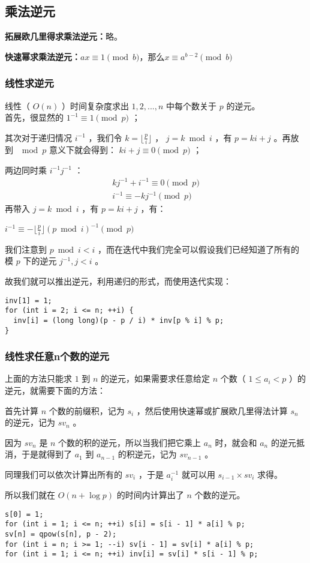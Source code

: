 \subsection{乘法逆元}
\textbf{拓展欧几里得求乘法逆元：}略。\par
\textbf{快速幂求乘法逆元：}$ax\equiv 1\pmod b\text{，那么} x\equiv a^{b-2}\pmod b$
\subsubsection{线性求逆元}
线性（ $O(n)$ ）时间复杂度求出 $1,2,...,n$ 中每个数关于 $p$ 的逆元。\\
首先，很显然的 $1^{-1} \equiv 1 \pmod p$ ；\par
其次对于递归情况 $i^{-1}$ ，我们令 $k = \lfloor \frac{p}{i} \rfloor$ ， $j = k \bmod i$ ，有 $p = ki + j$ 。再放到 $\mod p$ 意义下就会得到： $ki+j \equiv 0 \pmod p$ ；\par
两边同时乘 $i^{-1}j^{-1}$ ：
\begin{align*}
  kj^{-1}+i^{-1} \equiv 0 \pmod p \\
  i^{-1} \equiv -kj^{-1} \pmod p
\end{align*}
再带入 $j = k \bmod i$ ，有 $p = ki + j$ ，有：\par
 $i^{-1} \equiv -\lfloor\frac{p}{i}\rfloor (p \bmod i)^{-1} \pmod p$ 

我们注意到 $p \bmod i < i$ ，而在迭代中我们完全可以假设我们已经知道了所有的模 $p$ 下的逆元 $j^{-1}, j < i$ 。

故我们就可以推出逆元，利用递归的形式，而使用迭代实现：
\begin{lstlisting}
inv[1] = 1;
for (int i = 2; i <= n; ++i) {
  inv[i] = (long long)(p - p / i) * inv[p % i] % p;
}
\end{lstlisting}
\subsubsection{线性求任意n个数的逆元}
上面的方法只能求 $1$ 到 $n$ 的逆元，如果需要求任意给定 $n$ 个数（ $1 \le a_i < p$ ）的逆元，就需要下面的方法：\par
首先计算 $n$ 个数的前缀积，记为 $s_i$ ，然后使用快速幂或扩展欧几里得法计算 $s_n$ 的逆元，记为 $sv_n$ 。\par
因为 $sv_n$ 是 $n$ 个数的积的逆元，所以当我们把它乘上 $a_n$ 时，就会和 $a_n$ 的逆元抵消，于是就得到了 $a_1$ 到 $a_{n-1}$ 的积逆元，记为 $sv_{n-1}$ 。\par
同理我们可以依次计算出所有的 $sv_i$ ，于是 $a_i^{-1}$ 就可以用 $s_{i-1} \times sv_i$ 求得。\par
所以我们就在 $O(n + \log p)$ 的时间内计算出了 $n$ 个数的逆元。
\begin{lstlisting}
s[0] = 1;
for (int i = 1; i <= n; ++i) s[i] = s[i - 1] * a[i] % p;
sv[n] = qpow(s[n], p - 2);
for (int i = n; i >= 1; --i) sv[i - 1] = sv[i] * a[i] % p;
for (int i = 1; i <= n; ++i) inv[i] = sv[i] * s[i - 1] % p;
\end{lstlisting}
